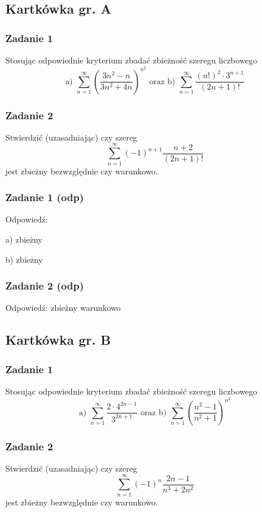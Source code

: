 \documentclass[11pt]{article}
\begin{document}
\subsection{Kartkówka gr. A}
\subsubsection{Zadanie 1}
Stosując odpowiednie kryterium zbadać zbieżność szeregu liczbowego
\[
    \text{a) } \sum_{n = 1}^{\infty}(\frac{3n^2 - n}{3n^2 + 4n})^{n^2} \text{ oraz }
    \text{b) }\sum_{n = 1}^{\infty}\frac{(n!)^2 \cdot 3^{n+1}}{(2n + 1)!}
\]

\subsubsection{Zadanie 2}
Stwierdzić (uzasadniając) czy szereg
\[
    \sum_{n = 1}^{\infty} (-1)^{n+1} \frac{n + 2}{(2n + 1)!}
\]
jest zbieżny bezwzględnie czy warunkowo.
\subsubsection{Zadanie 1 (odp)}
Odpowiedź: 
\begin{list}{}{}
    \item[a) ] zbieżny
    \item[b) ] zbieżny
\end{list}
\subsubsection{Zadanie 2 (odp)}
Odpowiedź: zbieżny warunkowo

\subsection{Kartkówka gr. B}
\subsubsection{Zadanie 1}
Stosując odpowiednie kryterium zbadać zbieżność szeregu liczbowego
\[
    \text{a) } \sum_{n = 1}^{\infty}\frac{2 \cdot 4^{2n - 1}}{3^{2n + 1}} \text{ oraz }
    \text{b) }\sum_{n = 1}^{\infty}(\frac{n^2 - 1}{n^2 + 1})^{n^3}
\]

\subsubsection{Zadanie 2}
Stwierdzić (uzasadniając) czy szereg
\[
    \sum_{n = 1}^{\infty} (-1)^{n} \frac{2n - 1}{n^3 + 2n^2}
\]
jest zbieżny bezwzględnie czy warunkowo.
\end{document}
